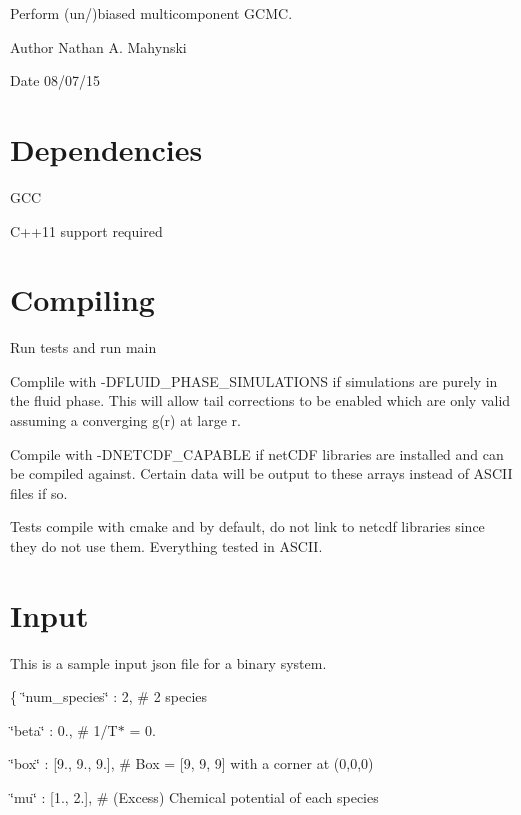 Perform (un/)biased multicomponent G\-C\-M\-C. \begin{DoxyAuthor}{Author}
Nathan A. Mahynski 
\end{DoxyAuthor}
\begin{DoxyDate}{Date}
08/07/15
\end{DoxyDate}
\hypertarget{index_Dependencies}{}\section{Dependencies}\label{index_Dependencies}

\begin{DoxyEnumerate}
\item G\-C\-C
\item C++11 support required
\end{DoxyEnumerate}\hypertarget{index_Compiling}{}\section{Compiling}\label{index_Compiling}
Run tests and run main

Complile with -\/\-D\-F\-L\-U\-I\-D\-\_\-\-P\-H\-A\-S\-E\-\_\-\-S\-I\-M\-U\-L\-A\-T\-I\-O\-N\-S if simulations are purely in the fluid phase. This will allow tail corrections to be enabled which are only valid assuming a converging g(r) at large r.

Compile with -\/\-D\-N\-E\-T\-C\-D\-F\-\_\-\-C\-A\-P\-A\-B\-L\-E if net\-C\-D\-F libraries are installed and can be compiled against. Certain data will be output to these arrays instead of A\-S\-C\-I\-I files if so.

Tests compile with cmake and by default, do not link to netcdf libraries since they do not use them. Everything tested in A\-S\-C\-I\-I.\hypertarget{index_Input}{}\section{Input}\label{index_Input}
This is a sample input json file for a binary system.

\{ \char`\"{}num\-\_\-species\char`\"{} \-: 2, \# 2 species

\char`\"{}beta\char`\"{} \-: 0., \# 1/\-T$\ast$ = 0.

\char`\"{}box\char`\"{} \-: \mbox{[}9., 9., 9.\mbox{]}, \# Box = \mbox{[}9, 9, 9\mbox{]} with a corner at (0,0,0)

\char`\"{}mu\char`\"{} \-: \mbox{[}1., 2.\mbox{]}, \# (Excess) Chemical potential of each species

